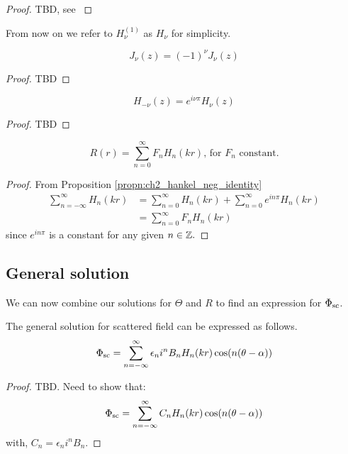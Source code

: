   \begin{proof}
      TBD, see \parencite[$\S$4.2]{martin06scattering}
  \end{proof}\par
%
From now on we refer to $H^{(1)}_\nu$ as $H_\nu$ for simplicity.
  \begin{propn}
    \[
    J_\nu(z) = (-1)^\nu J_\nu(z)
    \]
  \end{propn}
  \begin{proof}
    TBD
  \end{proof}
%
  \begin{propn}\label{propn:ch2_hankel_neg_identity}
    \[
    H_{-\nu}(z) = e^{i\nu \pi}H_\nu(z)
    \]
  \end{propn}
  \begin{proof}
    TBD
  \end{proof}
%
  \begin{propn}
    \begin{equation*}
      R(r) = \sum^\infty_{n=0} F_n H_n(kr) \text{, for $F_n$ constant.}
    \end{equation*}
  \end{propn}
  \begin{proof}
    From Proposition \ref{propn:ch2_hankel_neg_identity}
      \begin{align*}
        \sum^\infty_{n=-\infty} H_n(kr)
        & = \sum^\infty_{n=0} H_n(kr) + \sum^\infty_{n=0} e^{in\pi} H_n(kr)\\
        & = \sum^\infty_{n=0} F_n H_n(kr)
      \end{align*}
    since $e^{in\pi}$ is a constant for any given $n \in \mathbb{Z}.$
  \end{proof}
\subsection{General solution}
We can now combine our solutions for $\Theta$ and $R$ to find an expression for $\Phi_{\text{sc}}$.
%
    \begin{propn}
      The general solution for scattered field can be expressed as follows.
        \begin{equation} \label{eq:ch2_gen_eq_scattered_field}
            \Phi_{\text{sc}} = \sum^\infty_{n=-\infty} \epsilon_n i^n B_n H_n(kr) \cos(n(\theta-\alpha))
        \end{equation}
    \end{propn}
    \begin{proof} TBD. Need to show that:
      \[
      \Phi_{\text{sc}} = \sum^\infty_{n=-\infty} C_n H_n(kr) \cos(n(\theta-\alpha))
      \]
      with, $C_n = \epsilon_n i^n B_n$.
    \end{proof}
